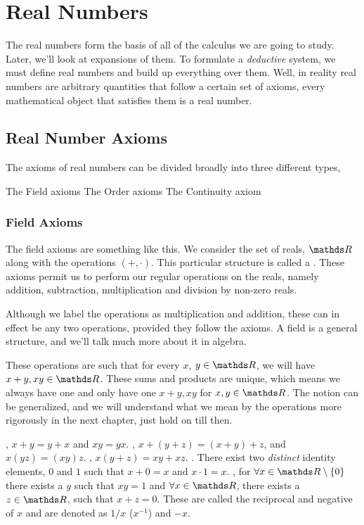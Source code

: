 \chapter{Real Numbers}
\margintoc
The real numbers form the basis of all of the calculus we are going to study. Later, we'll look at expansions of them.
To formulate a \emph{deductive} system, we must define real numbers and build up everything over them. Well, in reality
real numbers are arbitrary quantities that follow a certain set of axioms, every mathematical object that satisfies
them is a real number.

\section{Real Number Axioms}

The axioms of real numbers can be divided broadly into three different types,

\begin{itemize}
    \ii The Field axioms
    \ii The Order axioms
    \ii The Continuity axiom
\end{itemize}

\subsection{Field Axioms}

The field axioms are something like this. We consider the set of reals, \(\RR\)
along with the operations \((+, \cdot)\). This particular structure is called a 
. These axioms permit us to perform our regular operations on 
the reals, namely addition, subtraction, multiplication and division by non-zero
reals.

Although we label the operations as multiplication and addition, these can in effect be 
any two operations, provided they follow the axioms. A field is a general structure, 
and we'll talk much more about it in algebra.

These operations are such that for every \(x\), \(y \in \RR\), we will have \(x + y, xy \in \RR\). 
These sums and products are unique, which means we always have one and only have one 
\(x+y, xy\) for \(x, y \in \RR\). The notion can be generalized, and we will understand what we mean by 
the operations more rigorously in the next chapter, just hold on till then.

\begin{axioms}
    \ii {}, \(x+y = y+x\) and \(xy = yx\).
    \ii {}, \(x + (y+z) = (x+y) + z\), and \(x(yz) = (xy)z\).
    \ii {}, \(x(y + z) = xy + xz\).
    \ii {}. There exist two \emph{distinct} identity elements, \(0\) and \(1\) such that \(x + 0 = x\) and \(x \cdot 1 = x\).
    \ii {}, for \(\forall x \in \RR \setminus \{0\}\) there exists a \(y\) such that \(xy = 1\) and \(\forall x \in \RR\),
    there exists a \(z \in \RR\), such that \(x + z = 0\). These are called the reciprocal 
    and negative of \(x\) and are denoted as \(1/x\)  (\(x^{-1}\)) and \(-x\).
\end{axioms}
 
